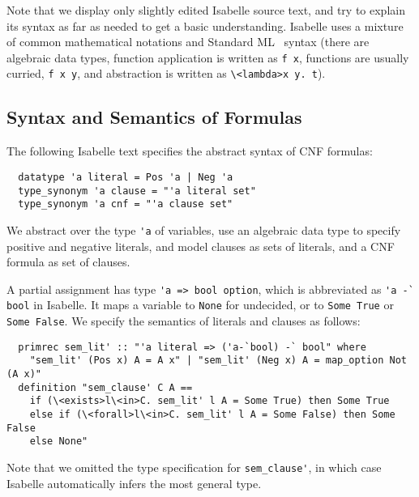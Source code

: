 \documentclass[smallcondensed]{svjour3}     %
\newcommand{\isai}{\lstinline[language=isabelle,basicstyle=\normalsize\ttfamily\slshape]}
\begin{document}
Note that we display only slightly edited Isabelle source text, and try to explain its syntax as far as needed to get a basic understanding.
Isabelle uses a mixture of common mathematical notations and Standard ML~\cite{MHMT97} syntax (\eg there are algebraic data types, function application is written as 
\isai$f x$, functions are usually curried, \eg \isai$f x y$, and abstraction is written as \isai$\<lambda>x y. t$).


\subsection{Syntax and Semantics of Formulas}
The following Isabelle text specifies the abstract syntax of CNF formulas:
\begin{lstlisting}
  datatype 'a literal = Pos 'a | Neg 'a
  type_synonym 'a clause = "'a literal set"
  type_synonym 'a cnf = "'a clause set"
\end{lstlisting}
We abstract over the type \isai$'a$ of variables, use an algebraic data type to specify positive and negative literals, and model clauses 
as sets of literals, and a CNF formula as set of clauses. 
% 
% 

A partial assignment has 
type \isai{'a => bool option}, which is abbreviated as \isai{'a -` bool} in Isabelle. 
It maps a variable to \isai{None} for undecided, or to \isai{Some True} or \isai{Some False}.
We specify the semantics of literals and clauses as follows:
\begin{lstlisting}
  primrec sem_lit' :: "'a literal => ('a-`bool) -` bool" where
    "sem_lit' (Pos x) A = A x" | "sem_lit' (Neg x) A = map_option Not (A x)"
  definition "sem_clause' C A ==
    if (\<exists>l\<in>C. sem_lit' l A = Some True) then Some True
    else if (\<forall>l\<in>C. sem_lit' l A = Some False) then Some False
    else None"
\end{lstlisting}
Note that we omitted the type specification for \isai{sem_clause'}, in which case Isabelle automatically infers the most general type.
\end{document}
